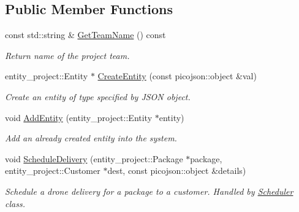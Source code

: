 \subsection*{Public Member Functions}
\begin{DoxyCompactItemize}
\item 
\mbox{\label{classcsci3081_1_1DroneSimulation_ab920d19a82bc4bb42722bffa3a6d0e6a}} 
const std\+::string \& \hyperlink{classcsci3081_1_1DroneSimulation_ab920d19a82bc4bb42722bffa3a6d0e6a}{Get\+Team\+Name} () const
\begin{DoxyCompactList}\small\item\em Return name of the project team. \end{DoxyCompactList}\item 
entity\+\_\+project\+::\+Entity $\ast$ \hyperlink{classcsci3081_1_1DroneSimulation_af969b43abab98c458a50cad9f99a0440}{Create\+Entity} (const picojson\+::object \&val)
\begin{DoxyCompactList}\small\item\em Create an entity of type specified by J\+S\+ON object. \end{DoxyCompactList}\item 
\mbox{\label{classcsci3081_1_1DroneSimulation_a197a3495b53ffd8041a94000eb799ef7}} 
void \hyperlink{classcsci3081_1_1DroneSimulation_a197a3495b53ffd8041a94000eb799ef7}{Add\+Entity} (entity\+\_\+project\+::\+Entity $\ast$entity)
\begin{DoxyCompactList}\small\item\em Add an already created entity into the system. \end{DoxyCompactList}\item 
\mbox{\label{classcsci3081_1_1DroneSimulation_a40816c8cef31df37015b54cc3f5015c3}} 
void \hyperlink{classcsci3081_1_1DroneSimulation_a40816c8cef31df37015b54cc3f5015c3}{Schedule\+Delivery} (entity\+\_\+project\+::\+Package $\ast$package, entity\+\_\+project\+::\+Customer $\ast$dest, const picojson\+::object \&details)
\begin{DoxyCompactList}\small\item\em Schedule a drone delivery for a package to a customer. Handled by \hyperlink{classcsci3081_1_1Scheduler}{Scheduler} class. \end{DoxyCompactList}\item 

\end{DoxyCompactItemize}
